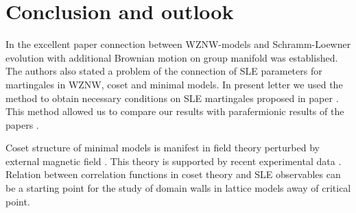 \documentclass{jetpl}
\newcommand{\gf}{\mathfrak{g}}
\newcommand{\af}{\mathfrak{a}}
\begin{document}
\section{Conclusion and outlook}
\label{sec:outlook}

In the excellent paper \cite{bettelheim2005stochastic} connection between WZNW-models and Schramm-Loewner evolution with additional Brownian motion on group manifold was established. The authors also stated a problem of the connection of SLE parameters for martingales in WZNW, coset and minimal models. In present letter we used the method to obtain necessary conditions on SLE martingales proposed in paper \cite{alekseev2010sle}. This method allowed us to compare our results with parafermionic results of the papers \cite{santachiara2008sle,picco2008numerical}.

Coset structure of minimal models is manifest in field theory perturbed by external magnetic field \cite{fateev1990conformal,eguchi1989deformations,hollowood1989rational}. This theory is supported by recent experimental data \cite{coldea2010quantum}. Relation between correlation functions in coset theory and SLE observables can be a starting point for the study of domain walls in lattice models away of critical point. 
\end{document}
